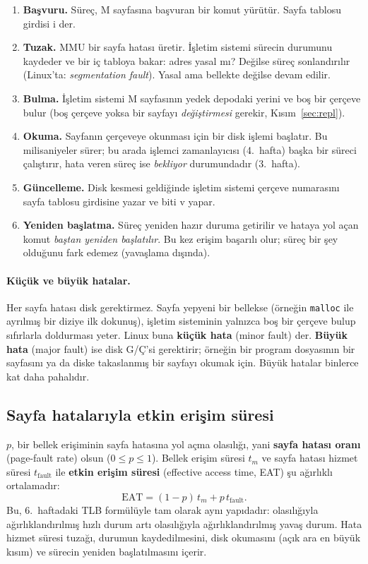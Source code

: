 \documentclass[11pt,a4paper]{article}
\newcommand{\term}[1]{\textbf{\color{mintdeep}#1}}
\newcommand{\cmd}[1]{\texttt{#1}}
\begin{document}
\begin{enumerate}[leftmargin=1.4em]
  \item \textbf{Başvuru.} Süreç, M sayfasına başvuran bir komut yürütür. Sayfa tablosu girdisi i der.
  \item \textbf{Tuzak.} MMU bir sayfa hatası üretir. İşletim sistemi sürecin durumunu kaydeder ve bir iç tabloya bakar: adres yasal mı? Değilse süreç sonlandırılır (Linux'ta: \emph{segmentation fault}). Yasal ama bellekte değilse devam edilir.
  \item \textbf{Bulma.} İşletim sistemi M sayfasının yedek depodaki yerini ve boş bir çerçeve bulur (boş çerçeve yoksa bir sayfayı \emph{değiştirmesi} gerekir, Kısım~\ref{sec:repl}).
  \item \textbf{Okuma.} Sayfanın çerçeveye okunması için bir disk işlemi başlatır. Bu milisaniyeler sürer; bu arada işlemci zamanlayıcısı (4.\ hafta) başka bir süreci çalıştırır, hata veren süreç ise \emph{bekliyor} durumundadır (3.\ hafta).
  \item \textbf{Güncelleme.} Disk kesmesi geldiğinde işletim sistemi çerçeve numarasını sayfa tablosu girdisine yazar ve biti v yapar.
  \item \textbf{Yeniden başlatma.} Süreç yeniden hazır duruma getirilir ve hataya yol açan komut \emph{baştan yeniden başlatılır}. Bu kez erişim başarılı olur; süreç bir şey olduğunu fark edemez (yavaşlama dışında).
\end{enumerate}

\paragraph{Küçük ve büyük hatalar.} Her sayfa hatası disk gerektirmez. Sayfa yepyeni bir bellekse (örneğin \cmd{malloc} ile ayrılmış bir diziye ilk dokunuş), işletim sisteminin yalnızca boş bir çerçeve bulup sıfırlarla doldurması yeter. Linux buna \term{küçük hata} (minor fault) der. \term{Büyük hata} (major fault) ise disk G/Ç'si gerektirir; örneğin bir program dosyasının bir sayfasını ya da diske takaslanmış bir sayfayı okumak için. Büyük hatalar binlerce kat daha pahalıdır.

\subsection{Sayfa hatalarıyla etkin erişim süresi}

$p$, bir bellek erişiminin sayfa hatasına yol açma olasılığı, yani \term{sayfa hatası oranı} (page-fault rate) olsun ($0 \le p \le 1$). Bellek erişim süresi $t_m$ ve sayfa hatası hizmet süresi $t_{\text{fault}}$ ile \term{etkin erişim süresi} (effective access time, EAT) şu ağırlıklı ortalamadır:
\[
\text{EAT} = (1-p)\, t_m + p\, t_{\text{fault}} .
\]
Bu, 6.\ haftadaki TLB formülüyle tam olarak aynı yapıdadır: olasılığıyla ağırlıklandırılmış hızlı durum artı olasılığıyla ağırlıklandırılmış yavaş durum. Hata hizmet süresi tuzağı, durumun kaydedilmesini, disk okumasını (açık ara en büyük kısım) ve sürecin yeniden başlatılmasını içerir.
\end{document}
